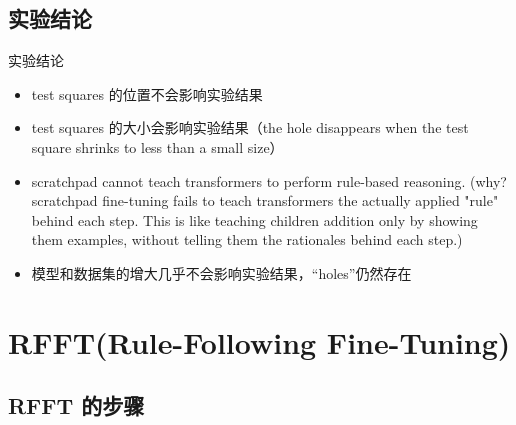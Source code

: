 \documentclass[aspectratio=169]{beamer}
\begin{document}
\subsection{实验结论}
\begin{frame}{实验结论}
	\begin{itemize}
		\item test squares 的位置不会影响实验结果
		      \pause
		\item test squares 的大小会影响实验结果（the hole disappears when the test square shrinks to less than a small size）
		      \pause
		\item scratchpad cannot teach transformers to perform rule-based reasoning. (why? scratchpad fine-tuning fails to teach transformers the actually applied "rule" behind each step. This is like teaching children addition only by showing them examples, without telling them the rationales behind each step.)
		      \pause
		\item 模型和数据集的增大几乎不会影响实验结果，“holes”仍然存在
	\end{itemize}
\end{frame}

\section{RFFT(Rule-Following Fine-Tuning)}

\subsection{RFFT 的步骤}
\end{document}
